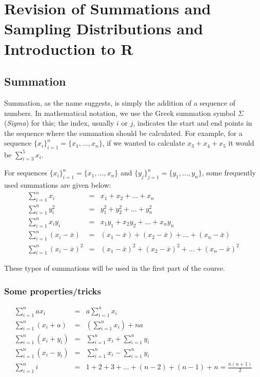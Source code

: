 \documentclass[12pt,a4paper,openany,twoside]{report}
\theoremstyle{definition}
\theoremstyle{remark}
\theoremstyle{plain}
\newcommand{\vsps}{\vspace{.5cm}}
\theoremstyle{definition}
\theoremstyle{definition}
\theoremstyle{definition}
\theoremstyle{remark}
\begin{document}
\hypertarget{revision}{%
\chapter{Revision of Summations and Sampling Distributions and Introduction to R}\label{revision}}

\hypertarget{revnotation}{%
\section{Summation}\label{revnotation}}

Summation, as the name suggests, is simply the addition of a sequence of numbers. In mathematical notation, we use the Greek summation symbol \(\Sigma\) (\textit{Sigma}) for this; the index, usually \(i\) or \(j\), indicates the start and end points in the sequence where the summation should be calculated. For example, for a sequence
\(\{x_i\}_{i=1}^{n}= \{x_1, \dots, x_n\}\), if we wanted to calculate \(x_3+x_4+x_5\) it would be \(\sum_{i=3}^5 x_i\).

For sequences \(\{x_i\}_{i=1}^{n}= \{x_1, \dots, x_n\}\) and \(\{y_j\}_{j=1}^{n}=\{y_1,\dots,y_n\}\), some frequently used summations are given below:
\begin{eqnarray*}
\sum_{i=1}^n x_i &=&  x_1 + x_2 + \ldots + x_n\\
\sum_{i=1}^n y_i^2 &=&  y_1^2 + y_2^2 + \ldots + y_n^2\\
\sum_{i=1}^n x_i y_i &=&  x_1 y_1 + x_2 y_2 + \ldots + x_n y_n\\
\sum_{i=1}^n (x_i - \bar{x}) &=& (x_1 - \bar{x}) + (x_2 - \bar{x}) + \ldots + (x_n - \bar{x})\\
\sum_{i=1}^n (x_i - \bar{x})^2 &=& (x_1 - \bar{x})^2 + (x_2 - \bar{x})^2 + \ldots + (x_n - \bar{x})^2
\end{eqnarray*}

These types of summations will be used in the first part of the course.

\hypertarget{some-propertiestricks}{%
\subsection*{Some properties/tricks}\label{some-propertiestricks}}

\begin{eqnarray*}
\sum_{i=1}^{n} a x_i &=& a \sum_{i=1}^{n} x_i \\
\sum_{i=1}^{n} (x_i + a) &=& \left(\sum_{i=1}^{n} x_i\right) + n a \\
\sum_{i=1}^{n} (x_i + y_i) &=& \sum_{i=1}^{n} x_i + \sum_{i=1}^{n} y_i \\
\sum_{i=1}^{n} (x_i - y_i) &=& \sum_{i=1}^{n} x_i - \sum_{i=1}^{n} y_i \\
\sum_{i=1}^{n} i &=& 1 + 2 + 3 + \ldots + (n-2) + (n-1) + n = \frac{n(n+1)}{2}
\end{eqnarray*}
\vsps
\end{document}
